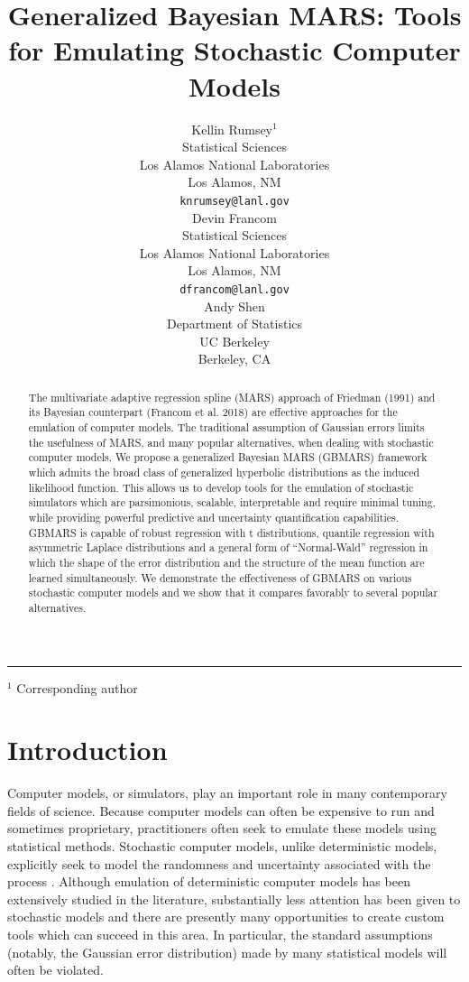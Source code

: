 \documentclass{article} %
\title{Generalized Bayesian MARS: Tools for Emulating Stochastic Computer Models}
\author{
Kellin Rumsey$^1$ \\
Statistical Sciences\\
Los Alamos National Laboratories \\
Los Alamos, NM \\
\texttt{knrumsey@lanl.gov} \\
\And
Devin Francom \\
Statistical Sciences\\
Los Alamos National Laboratories \\
Los Alamos, NM  \\
\texttt{dfrancom@lanl.gov} \\
\And
Andy Shen \\
Department of Statistics\\
UC Berkeley \\
Berkeley, CA  \\
}
\begin{document}
\maketitle

\normalsize

\doublespacing
\vspace*{-30pt}

\begin{abstract}
The multivariate adaptive regression spline (MARS) approach of Friedman (1991) and its Bayesian counterpart (Francom et al. 2018) are effective approaches for the emulation of computer models. The traditional assumption of Gaussian errors limits the usefulness of MARS, and many popular alternatives, when dealing with stochastic computer models. We propose a generalized Bayesian MARS (GBMARS) framework which admits the broad class of generalized hyperbolic distributions as the induced likelihood function. This allows us to develop tools for the emulation of stochastic simulators which are parsimonious, scalable, interpretable and require minimal tuning, while providing powerful predictive and uncertainty quantification capabilities. GBMARS is capable of robust regression with t distributions, quantile regression with asymmetric Laplace distributions and a general form of “Normal-Wald” regression in which the shape of the error distribution and the structure of the mean function are learned simultaneously. We demonstrate the effectiveness of GBMARS on various stochastic computer models and we show that it compares favorably to several popular alternatives.
\end{abstract}

\vspace*{0.1cm}\hrule ${}^1$ Corresponding author

\newpage

\standardsize
\doublespacing

\section{Introduction}

Computer models, or simulators, play an important role in many contemporary fields of science. Because computer models can often be expensive to run and sometimes proprietary, practitioners often seek to emulate these models using statistical methods. Stochastic computer models, unlike deterministic models, explicitly seek to model the randomness and uncertainty associated with the process \citep{baker2022analyzing}. Although emulation of deterministic computer models has been extensively studied in the literature, substantially less attention has been given to stochastic models and there are presently many opportunities to create custom tools which can succeed in this area. In particular, the standard assumptions (notably, the Gaussian error distribution) made by many statistical models will often be violated. 
\end{document}
